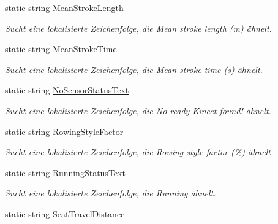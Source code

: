 \begin{DoxyCompactItemize}
static string \hyperlink{class_rowing_monitor_1_1_properties_1_1_resources_a704f021aad75ca92700dfe7cdb189670}{Mean\+Stroke\+Length}
\begin{DoxyCompactList}\small\item\em Sucht eine lokalisierte Zeichenfolge, die Mean stroke length (m) ähnelt. \end{DoxyCompactList}\item 
static string \hyperlink{class_rowing_monitor_1_1_properties_1_1_resources_a880c3e3f52ed32f7e09fb5dde7f7220a}{Mean\+Stroke\+Time}
\begin{DoxyCompactList}\small\item\em Sucht eine lokalisierte Zeichenfolge, die Mean stroke time (s) ähnelt. \end{DoxyCompactList}\item 
static string \hyperlink{class_rowing_monitor_1_1_properties_1_1_resources_a47a30e91e4789279914f53985bae7151}{No\+Sensor\+Status\+Text}
\begin{DoxyCompactList}\small\item\em Sucht eine lokalisierte Zeichenfolge, die No ready Kinect found! ähnelt. \end{DoxyCompactList}\item 
static string \hyperlink{class_rowing_monitor_1_1_properties_1_1_resources_abdf073638a1892c68c06325cff16f382}{Rowing\+Style\+Factor}
\begin{DoxyCompactList}\small\item\em Sucht eine lokalisierte Zeichenfolge, die Rowing style factor (\%) ähnelt. \end{DoxyCompactList}\item 
static string \hyperlink{class_rowing_monitor_1_1_properties_1_1_resources_a12657e89c9fff2bec7af3cf8caaf6093}{Running\+Status\+Text}
\begin{DoxyCompactList}\small\item\em Sucht eine lokalisierte Zeichenfolge, die Running ähnelt. \end{DoxyCompactList}\item 
static string \hyperlink{class_rowing_monitor_1_1_properties_1_1_resources_aca5c841d63ec2df9c33e4728c09fdf8f}{Seat\+Travel\+Distance}

\end{DoxyCompactItemize}
